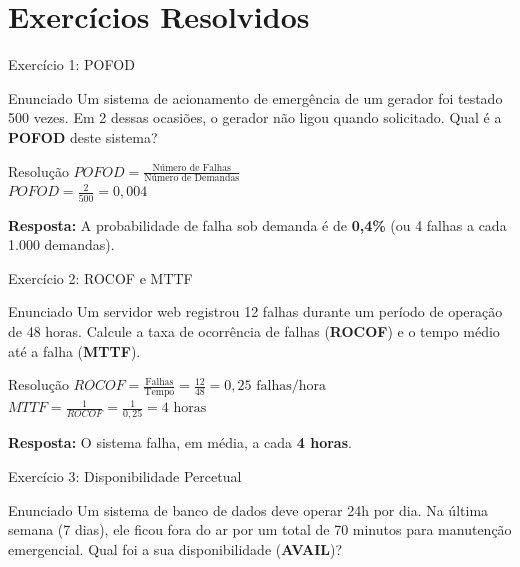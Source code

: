 \documentclass[9pt]{beamer}
\begin{document}
\section{Exercícios Resolvidos}
\begin{frame}{Exercício 1: POFOD}
    \begin{block}{Enunciado}
        Um sistema de acionamento de emergência de um gerador foi testado 500 vezes. Em 2 dessas ocasiões, o gerador não ligou quando solicitado. Qual é a \textbf{POFOD} deste sistema?
    \end{block}

    \pause
    \begin{exampleblock}{Resolução}
        $POFOD = \frac{\text{Número de Falhas}}{\text{Número de Demandas}}$ \\
        \vspace{0.2cm}
        $POFOD = \frac{2}{500} = 0,004$
    \end{exampleblock}

    \textbf{Resposta:} A probabilidade de falha sob demanda é de \textbf{0,4\%} (ou 4 falhas a cada 1.000 demandas).
\end{frame}\begin{frame}{Exercício 2: ROCOF e MTTF}
    \begin{block}{Enunciado}
        Um servidor web registrou 12 falhas durante um período de operação de 48 horas. Calcule a taxa de ocorrência de falhas (\textbf{ROCOF}) e o tempo médio até a falha (\textbf{MTTF}).
    \end{block}

    \pause
    \begin{exampleblock}{Resolução}
        $ROCOF = \frac{\text{Falhas}}{\text{Tempo}} = \frac{12}{48} = 0,25 \text{ falhas/hora}$ \\
        \vspace{0.3cm}
        $MTTF = \frac{1}{ROCOF} = \frac{1}{0,25} = 4 \text{ horas}$
    \end{exampleblock}

    \textbf{Resposta:} O sistema falha, em média, a cada \textbf{4 horas}.
\end{frame}\begin{frame}{Exercício 3: Disponibilidade Percetual}
    \begin{block}{Enunciado}
        Um sistema de banco de dados deve operar 24h por dia. Na última semana (7 dias), ele ficou fora do ar por um total de 70 minutos para manutenção emergencial. Qual foi a sua disponibilidade (\textbf{AVAIL})?
    \end{block}


\end{frame}
\end{document}
